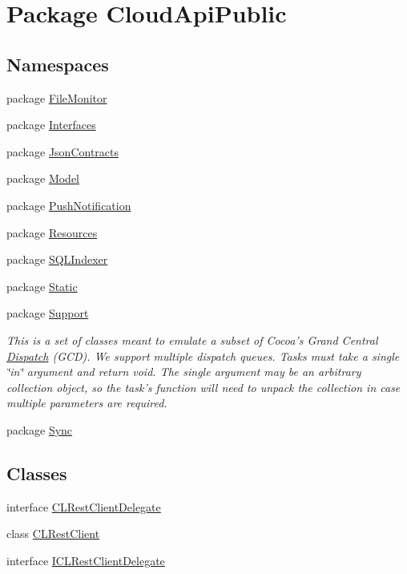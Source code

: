 \hypertarget{namespace_cloud_api_public}{\section{Package Cloud\-Api\-Public}
\label{namespace_cloud_api_public}
}
\subsection*{Namespaces}
\begin{DoxyCompactItemize}
\item 
package \hyperlink{namespace_cloud_api_public_1_1_file_monitor}{File\-Monitor}
\item 
package \hyperlink{namespace_cloud_api_public_1_1_interfaces}{Interfaces}
\item 
package \hyperlink{namespace_cloud_api_public_1_1_json_contracts}{Json\-Contracts}
\item 
package \hyperlink{namespace_cloud_api_public_1_1_model}{Model}
\item 
package \hyperlink{namespace_cloud_api_public_1_1_push_notification}{Push\-Notification}
\item 
package \hyperlink{namespace_cloud_api_public_1_1_resources}{Resources}
\item 
package \hyperlink{namespace_cloud_api_public_1_1_s_q_l_indexer}{S\-Q\-L\-Indexer}
\item 
package \hyperlink{namespace_cloud_api_public_1_1_static}{Static}
\item 
package \hyperlink{namespace_cloud_api_public_1_1_support}{Support}
\begin{DoxyCompactList}\small\item\em This is a set of classes meant to emulate a subset of Cocoa's Grand Central \hyperlink{class_cloud_api_public_1_1_support_1_1_dispatch}{Dispatch} (G\-C\-D). We support multiple dispatch queues. Tasks must take a single \char`\"{}in\char`\"{} argument and return void. The single argument may be an arbitrary collection object, so the task's function will need to unpack the collection in case multiple parameters are required. \end{DoxyCompactList}\item 
package \hyperlink{namespace_cloud_api_public_1_1_sync}{Sync}
\end{DoxyCompactItemize}
\subsection*{Classes}
\begin{DoxyCompactItemize}
\item 
interface \hyperlink{interface_cloud_api_public_1_1_c_l_rest_client_delegate}{C\-L\-Rest\-Client\-Delegate}
\item 
class \hyperlink{class_cloud_api_public_1_1_c_l_rest_client}{C\-L\-Rest\-Client}
\item 
interface \hyperlink{interface_cloud_api_public_1_1_i_c_l_rest_client_delegate}{I\-C\-L\-Rest\-Client\-Delegate}
\end{DoxyCompactItemize}
